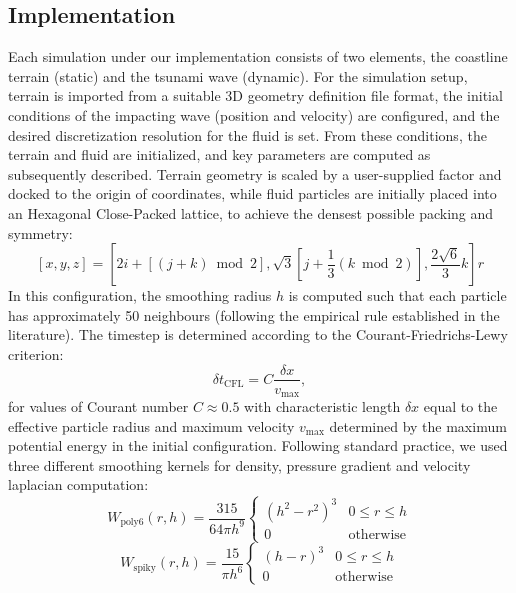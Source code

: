 \documentclass{llncs}
\begin{document}
\subsection{Implementation}
Each simulation under our implementation consists of two elements, the coastline terrain
(static) and the tsunami wave (dynamic). For the simulation setup, terrain is imported
from a suitable 3D geometry definition file format, the initial conditions of the
impacting wave (position and velocity) are configured, and the desired discretization
resolution for the fluid is set. From these conditions, the terrain and fluid are
initialized, and key parameters are computed as subsequently described. Terrain geometry
is scaled by a user-supplied factor and docked to the origin of coordinates, while fluid
particles are initially placed into an Hexagonal Close-Packed lattice, to achieve the
densest possible packing and symmetry:
\begin{equation}
  \label{eq:hcp}
  [x, y, z] = \left[ 2i+[(j+k) \bmod 2], \sqrt{3}[j + \frac{1}{3} (k \bmod 2)],
    \frac{2\sqrt{6}}{3} k \right] r
\end{equation}
In this configuration, the smoothing radius $h$ is computed such that each particle has
approximately 50 neighbours (following the empirical rule established in the
literature). The timestep is determined according to the Courant-Friedrichs-Lewy
criterion:
\begin{equation}
  \label{eq:cfl}
  \delta t_{\text{CFL}} = C \frac {\delta x}{v_{\text{max}}},
\end{equation}
for values of Courant number $C\approx0.5$ with characteristic length $\delta x$ equal to
the effective particle radius and maximum velocity $v_{\text{max}}$ determined by the
maximum potential energy in the initial configuration. Following standard practice, we
used three different smoothing kernels for density, pressure gradient and velocity
laplacian computation:
\begin{equation}
  \label{eq:poly6}
  W_{\text{poly6}}(r, h) = \frac{315}{64 \pi h^9}
  \begin{cases}
    (h^2 - r^2)^3 & 0 \leq r \leq h\\
    0 & \text{otherwise}
  \end{cases}
\end{equation}
\begin{equation}
  \label{eq:spiky}
  W_{\text{spiky}}(r, h) = \frac{15}{\pi h^6}
  \begin{cases}
    (h - r)^3 & 0 \leq r \leq h\\
    0 & \text{otherwise}
  \end{cases}
\end{equation}
\end{document}
